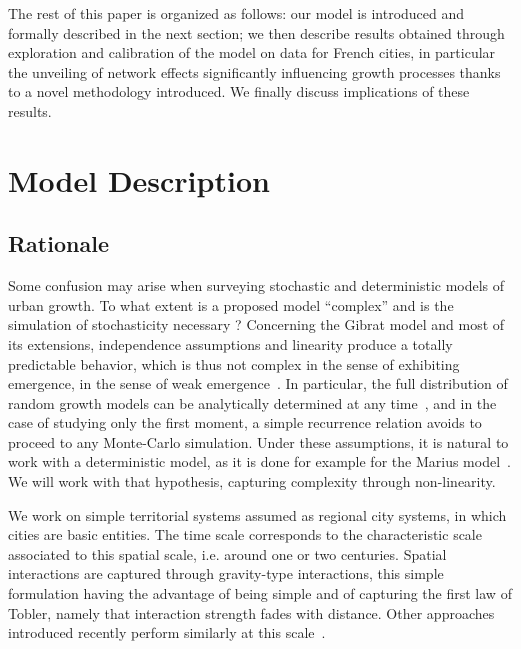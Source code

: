 \documentclass{article}
\begin{document}
The rest of this paper is organized as follows: our model is introduced and formally described in the next section; we then describe results obtained through exploration and calibration of the model on data for French cities, in particular the unveiling of network effects significantly influencing growth processes thanks to a novel methodology introduced. We finally discuss implications of these results.





\section*{Model Description}




\subsection*{Rationale}


Some confusion may arise when surveying stochastic and deterministic models of urban growth. To what extent is a proposed model ``complex'' and is the simulation of stochasticity necessary ? Concerning the Gibrat model and most of its extensions, independence assumptions and linearity produce a totally predictable behavior, which is thus not complex in the sense of exhibiting emergence, in the sense of weak emergence~\citep{bedau2002downward}. In particular, the full distribution of random growth models can be analytically determined at any time~\citep{gabaix1999zipf}, and in the case of studying only the first moment, a simple recurrence relation avoids to proceed to any Monte-Carlo simulation. Under these assumptions, it is natural to work with a deterministic model, as it is done for example for the Marius model~\citep{cottineau2014evolution}. We will work with that hypothesis, capturing complexity through non-linearity.

We work on simple territorial systems assumed as regional city systems, in which cities are basic entities. The time scale corresponds to the characteristic scale associated to this spatial scale, i.e. around one or two centuries. Spatial interactions are captured through gravity-type interactions, this simple formulation having the advantage of being simple and of capturing the first law of Tobler, namely that interaction strength fades with distance. Other approaches introduced recently perform similarly at this scale~\citep{masucci2013gravity}.
\end{document}
